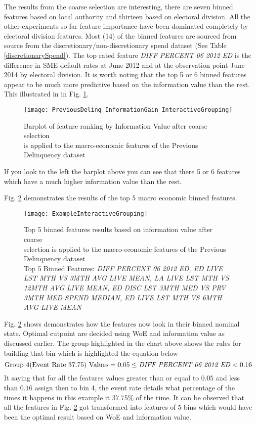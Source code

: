 The results from the coarse selection are interesting, there are seven binned features based on local authority and thirteen based on electoral division. All the other experiments so far feature importance have been dominated completely by electoral division features. Most (14) of the binned features are sourced from source from the discretionary/non-discretionary spend dataset  (See Table \ref{discretionarySpend}). The top rated feature \textit{DIFF PERCENT 06 2012 ED} is the difference in SME default rates at June 2012 and at the observation point June 2014 by electoral division. It is worth noting that the top 5 or 6 binned features appear to be much more predictive based on the information value than the rest. This illustrated in in Fig. \ref{fig:Information Value using SAS Previous Delinquency Features}.

\begin{figure}[H]
	\texttt{[image: PreviousDelinq\_InformationGain\_InteractiveGrouping]}
	\caption{Barplot of feature ranking by Information Value after coarse selection \\is applied to the macro-economic features of the Previous Delinquency dataset}
	\label{fig:Information Value using SAS Previous Delinquency Features}
\end{figure}

If you look to the left the barplot above you can see that there 5 or 6 features which have a much higher information value than the rest.


Fig. \ref{fig:Interactive Grouping Diff Percent 06 2012 ED} demonstrates the results of the top 5 macro economic binned features.
\begin{figure}[H]
	\texttt{[image: ExampleInteractiveGrouping]}
	\caption{Top 5 binned features results based on information value after coarse \\selection is applied to the macro-economic features of the Previous Delinquency dataset
	\\ Top 5 Binned Features: \textit{DIFF PERCENT 06 2012 ED, ED LIVE LST MTH VS 3MTH AVG LIVE MEAN, LA LIVE LST MTH VS 12MTH AVG LIVE MEAN, ED DISC LST 3MTH MED VS PRV 3MTH MED SPEND MEDIAN, ED LIVE LST MTH VS 6MTH AVG LIVE MEAN}}
	\label{fig:Interactive Grouping Diff Percent 06 2012 ED}
\end{figure}

Fig. \ref{fig:Interactive Grouping Diff Percent 06 2012 ED} shows demonstrates how the features now look in their binned nominal state. Optimal cutpoint are decided using WoE and information value as discussed earlier. The group highlighted in the chart above shows the rules for building that bin which is highlighted the equation below
\[
\text{Group 4(Event Rate 37.75) Values} = 0.05 \leq \text{\textit{DIFF PERCENT 06 2012 ED}} < 0.16
\]
It saying that for all the features values greater than or equal to $0.05$ and less than $0.16$ assign then to bin 4, the event rate details what percentage of the times it happens in this example it 37.75\% of the time. It can be observed that all the features in Fig. \ref{fig:Interactive Grouping Diff Percent 06 2012 ED} got transformed into features of 5 bins which would have been the optimal result based on WoE and information value.

